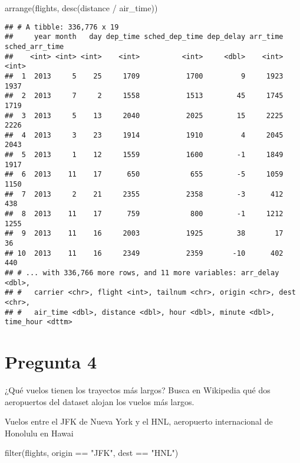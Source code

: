 \documentclass[
]{article}
\newenvironment{Shaded}{\begin{snugshade}}{\end{snugshade}}
\newcommand{\FunctionTok}[1]{\textcolor[rgb]{0.00,0.00,0.00}{#1}}
\newcommand{\NormalTok}[1]{#1}
\newcommand{\SpecialCharTok}[1]{\textcolor[rgb]{0.00,0.00,0.00}{#1}}
\newcommand{\StringTok}[1]{\textcolor[rgb]{0.31,0.60,0.02}{#1}}
\begin{document}
\begin{Shaded}
\begin{Highlighting}[]
\FunctionTok{arrange}\NormalTok{(flights, }\FunctionTok{desc}\NormalTok{(distance }\SpecialCharTok{/}\NormalTok{ air\_time))}
\end{Highlighting}
\end{Shaded}

\begin{verbatim}
## # A tibble: 336,776 x 19
##     year month   day dep_time sched_dep_time dep_delay arr_time sched_arr_time
##    <int> <int> <int>    <int>          <int>     <dbl>    <int>          <int>
##  1  2013     5    25     1709           1700         9     1923           1937
##  2  2013     7     2     1558           1513        45     1745           1719
##  3  2013     5    13     2040           2025        15     2225           2226
##  4  2013     3    23     1914           1910         4     2045           2043
##  5  2013     1    12     1559           1600        -1     1849           1917
##  6  2013    11    17      650            655        -5     1059           1150
##  7  2013     2    21     2355           2358        -3      412            438
##  8  2013    11    17      759            800        -1     1212           1255
##  9  2013    11    16     2003           1925        38       17             36
## 10  2013    11    16     2349           2359       -10      402            440
## # ... with 336,766 more rows, and 11 more variables: arr_delay <dbl>,
## #   carrier <chr>, flight <int>, tailnum <chr>, origin <chr>, dest <chr>,
## #   air_time <dbl>, distance <dbl>, hour <dbl>, minute <dbl>, time_hour <dttm>
\end{verbatim}

\hypertarget{pregunta-4}{%
\section{Pregunta 4}\label{pregunta-4}}

¿Qué vuelos tienen los trayectos más largos? Busca en Wikipedia qué dos
aeropuertos del dataset alojan los vuelos más largos.

Vuelos entre el JFK de Nueva York y el HNL, aeropuerto internacional de
Honolulu en Hawai

\begin{Shaded}
\begin{Highlighting}[]
\FunctionTok{filter}\NormalTok{(flights, origin }\SpecialCharTok{==} \StringTok{"JFK"}\NormalTok{, dest }\SpecialCharTok{==} \StringTok{"HNL"}\NormalTok{)}
\end{Highlighting}
\end{Shaded}
\end{document}
